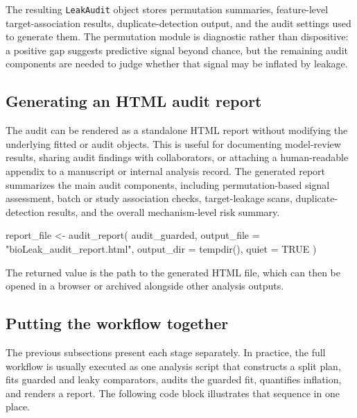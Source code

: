 \documentclass[article]{jss}
\begin{document}
The resulting \texttt{LeakAudit} object stores permutation summaries, feature-level target-association results, duplicate-detection output, and the audit settings used to generate them. The permutation module is diagnostic rather than dispositive: a positive gap suggests predictive signal beyond chance, but the remaining audit components are needed to judge whether that signal may be inflated by leakage.

\subsection{Generating an HTML audit report}

The audit can be rendered as a standalone HTML report without modifying the underlying fitted or audit objects. This is useful for documenting model-review results, sharing audit findings with collaborators, or attaching a human-readable appendix to a manuscript or internal analysis record. The generated report summarizes the main audit components, including permutation-based signal assessment, batch or study association checks, target-leakage scans, duplicate-detection results, and the overall mechanism-level risk summary.

\begin{CodeInput}
report_file <- audit_report(
  audit_guarded,
  output_file = "bioLeak_audit_report.html",
  output_dir = tempdir(),
  quiet = TRUE
)
\end{CodeInput}

\noindent
The returned value is the path to the generated HTML file, which can then be opened in a browser or archived alongside other analysis outputs.

\subsection{Putting the workflow together}

The previous subsections present each stage separately. In practice, the full
workflow is usually executed as one analysis script that constructs a split
plan, fits guarded and leaky comparators, audits the guarded fit, quantifies
inflation, and renders a report. The following code block illustrates that
sequence in one place.
\end{document}
